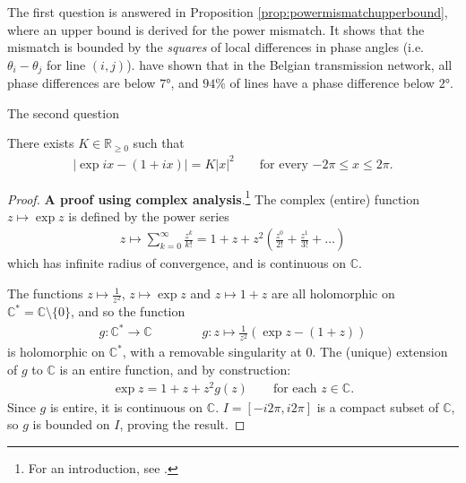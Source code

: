 \documentclass[main.tex]{subfiles}
\begin{document}
The first question is answered in Proposition \ref{prop:powermismatchupperbound}, where an upper bound is derived for the power mismatch. It shows that the mismatch is bounded by the \emph{squares} of local differences in phase angles (i.e. $\theta_i - \theta_j$ for line $(i,j)$). \citet{Purchala} have shown that in the Belgian transmission network, all phase differences are below $7 \si{\degree}$, and $94\si{\percent}$ of lines have a phase difference below $2\si{\degree}$.

The second question  


\begin{lemma}\label{lem:expaprrox}
There exists $K \in \mathbb{R}_{\geq 0}$ such that
\begin{align*}
    |\exp ix - (1 + ix)| = K |x|^2 \qquad \text{for every $-2\pi \leq x \leq 2\pi$}.
\end{align*}
\end{lemma}

\begin{proof}
\textbf{A proof using complex analysis}.\footnote{For an introduction, see \cite{GarlingVolIII}.} The complex (entire) function $z \mapsto \exp z$ is defined by the power series
\begin{align*}
    z\mapsto \sum_{k=0}^{\infty} \frac{z^k}{k!} = 1 + z + z^2\left(\frac{z^0}{2!}+\frac{z^1}{3!}+\dots\right)
\end{align*}
which has infinite radius of convergence, and is continuous on $\mathbb{C}$.

The functions $z \mapsto \frac{1}{z^2}$, $z \mapsto \exp z$ and $z \mapsto 1+z$ are all holomorphic on $\mathbb{C}^*=\mathbb{C} \setminus \{0\}$, and so the function
\begin{align}
    g: \mathbb{C}^* \rightarrow \mathbb{C} \qquad \qquad
    g: z \mapsto \frac{1}{z^2}(\exp z - (1+z))
\end{align}
is holomorphic on $\mathbb{C}^*$, with a removable singularity at $0$. The (unique) extension of $g$ to $\mathbb{C}$ is an entire function, and by construction:
\begin{align*}
    \exp z = 1 + z + z^2g(z)\qquad \text{for each $z \in \mathbb{C}$}.
\end{align*}
Since $g$ is entire, it is continuous on $\mathbb{C}$.
$I=[-i2\pi, i2\pi]$ is a compact subset of $\mathbb{C}$, so $g$ is bounded on $I$, proving the result.
\end{proof}
\end{document}
